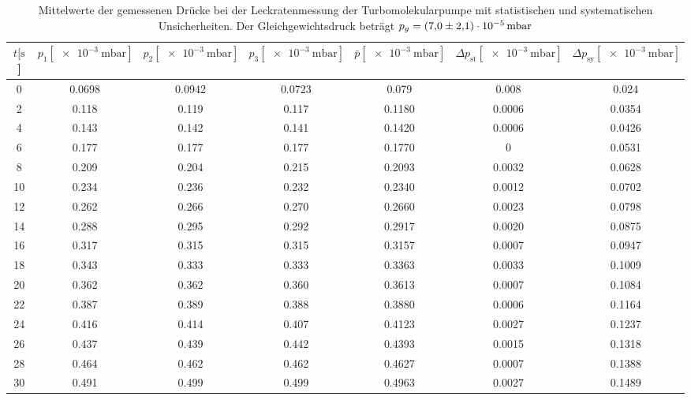 \begin{table}[H]
  \centering
    \caption{Mittelwerte der gemessenen Drücke bei der Leckratenmessung der Turbomolekularpumpe mit statistischen und systematischen Unsicherheiten. Der Gleichgewichtsdruck beträgt $p_g=\SI{7.0 \pm 2.1 e-5}{\milli\bar}$}
    \label{tab:Turbo_Leck2}
    \small{
    \begin{tabular}{
      S[table-format=3.0] 
      S[table-format=1.4] S[table-format=1.4] S[table-format=1.4]
      S[table-format=1.4] S[table-format=1.4] S[table-format=1.3]
      }
      \toprule
      {$t [\si{\second}$]} &
      {$p_1 [\SI{e-3}{\milli\bar}]$} & {$p_2 [\SI{e-3}{\milli\bar}]$} & {$p_3 [\SI{e-3}{\milli\bar}]$} &
      {$\bar{p} [\SI{e-3}{\milli\bar}]$} & {$\Delta p_\text{st} [\SI{e-3}{\milli\bar}]$} & {$\Delta p_\text{sy} [\SI{e-3}{\milli\bar}]$}\\
         & 0.0698 & 0.0942 & 0.0723 & 0.079   & 0.008   & 0.024  \\
      2   & 0.118  & 0.119  & 0.117  & 0.1180  & 0.0006  & 0.0354 \\
      4   & 0.143  & 0.142  & 0.141  & 0.1420  & 0.0006  & 0.0426 \\
      6   & 0.177  & 0.177  & 0.177  & 0.1770  & 0       & 0.0531 \\
      8   & 0.209  & 0.204  & 0.215  & 0.2093  & 0.0032  & 0.0628 \\
      10  & 0.234  & 0.236  & 0.232  & 0.2340  & 0.0012  & 0.0702 \\
      12  & 0.262  & 0.266  & 0.270  & 0.2660  & 0.0023  & 0.0798 \\
      14  & 0.288  & 0.295  & 0.292  & 0.2917  & 0.0020  & 0.0875 \\
      16  & 0.317  & 0.315  & 0.315  & 0.3157  & 0.0007  & 0.0947 \\
      18  & 0.343  & 0.333  & 0.333  & 0.3363  & 0.0033  & 0.1009 \\
      20  & 0.362  & 0.362  & 0.360  & 0.3613  & 0.0007  & 0.1084 \\
      22  & 0.387  & 0.389  & 0.388  & 0.3880  & 0.0006  & 0.1164 \\
      24  & 0.416  & 0.414  & 0.407  & 0.4123  & 0.0027  & 0.1237 \\
      26  & 0.437  & 0.439  & 0.442  & 0.4393  & 0.0015  & 0.1318 \\
      28  & 0.464  & 0.462  & 0.462  & 0.4627  & 0.0007  & 0.1388 \\
      30  & 0.491  & 0.499  & 0.499  & 0.4963  & 0.0027  & 0.1489 \\

\end{tabular}}
\end{table}
